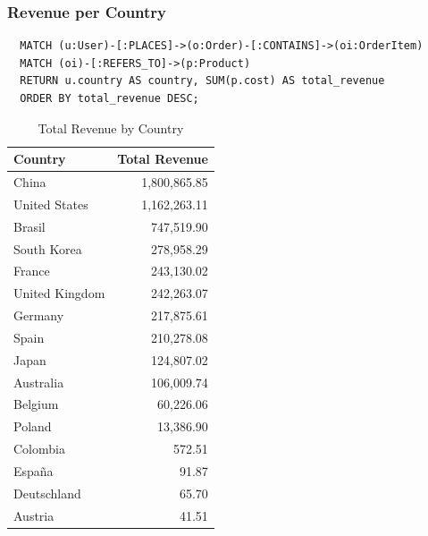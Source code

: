 \documentclass[a4paper,12pt]{article}
\begin{document}
\subsubsection{Revenue per Country}
\begin{verbatim}
  MATCH (u:User)-[:PLACES]->(o:Order)-[:CONTAINS]->(oi:OrderItem)
  MATCH (oi)-[:REFERS_TO]->(p:Product)
  RETURN u.country AS country, SUM(p.cost) AS total_revenue
  ORDER BY total_revenue DESC;
\end{verbatim}
\begin{table}[h!]
  \centering
  \caption{Total Revenue by Country}
  \label{tab:total_revenue}
  \begin{tabular}{l r}
      \toprule
      \textbf{Country} & \textbf{Total Revenue} \\
      \midrule
      China           & 1,800,865.85 \\
      United States   & 1,162,263.11 \\
      Brasil          & 747,519.90 \\
      South Korea     & 278,958.29 \\
      France          & 243,130.02 \\
      United Kingdom  & 242,263.07 \\
      Germany         & 217,875.61 \\
      Spain           & 210,278.08 \\
      Japan           & 124,807.02 \\
      Australia       & 106,009.74 \\
      Belgium         & 60,226.06 \\
      Poland          & 13,386.90 \\
      Colombia        & 572.51 \\
      España          & 91.87 \\
      Deutschland     & 65.70 \\
      Austria         & 41.51 \\
      \bottomrule
  \end{tabular}
\end{table}
\end{document}
